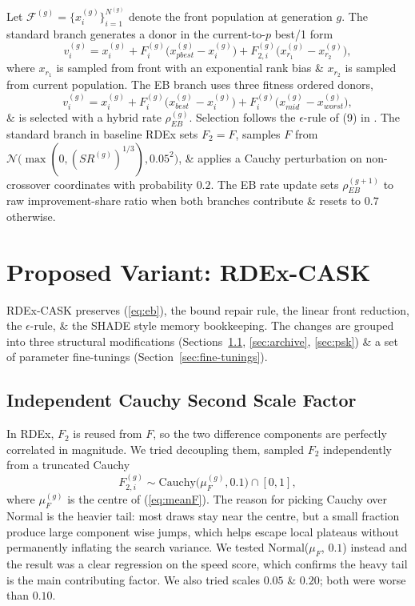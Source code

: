 \documentclass[conference]{IEEEtran}
\begin{document}
Let $\mathcal{F}^{(g)} = \{x_i^{(g)}\}_{i=1}^{N^{(g)}}$ denote the front population at generation $g$. The standard branch generates a donor in the current-to-$p$ best/1 form
\begin{equation}
v_i^{(g)} = x_i^{(g)} + F_i^{(g)}\!\big(x_{pbest}^{(g)} - x_i^{(g)}\big) + F_{2,i}^{(g)}\!\big(x_{r_1}^{(g)} - x_{r_2}^{(g)}\big),
\label{eq:std}
\end{equation}
where $x_{r_1}$ is sampled from front with an exponential rank bias \& $x_{r_2}$ is sampled from current population. The EB branch uses three fitness ordered donors,
\begin{equation}
v_i^{(g)} = x_i^{(g)} + F_i^{(g)}\!\big(x_{best}^{(g)} - x_i^{(g)}\big) + F_i^{(g)}\!\big(x_{mid}^{(g)} - x_{worst}^{(g)}\big),
\label{eq:eb}
\end{equation}
\& is selected with a hybrid rate $\rho_{EB}^{(g)}$. Selection follows the $\epsilon$-rule of (9) in \cite{tao2026rdex}. The standard branch in baseline RDEx sets $F_2 = F$, samples $F$ from $\mathcal{N}\!\bigl(\max(0,(SR^{(g)})^{1/3}), 0.05^2\bigr)$, \& applies a Cauchy perturbation on non-crossover coordinates with probability $0.2$. The EB rate update sets $\rho_{EB}^{(g+1)}$ to raw improvement-share ratio when both branches contribute \& resets to $0.7$ otherwise.

\section{Proposed Variant: RDEx-CASK}
RDEx-CASK preserves (\ref{eq:eb}), the bound repair rule, the linear front reduction, the $\epsilon$-rule, \& the SHADE style memory bookkeeping. The changes are grouped into three structural modifications (Sections~\ref{sec:cauchy}, \ref{sec:archive}, \ref{sec:psk}) \& a set of parameter fine-tunings (Section~\ref{sec:fine-tunings}).

\subsection{Independent Cauchy Second Scale Factor}
\label{sec:cauchy}
In RDEx, $F_2$ is reused from $F$, so the two difference components are perfectly correlated in magnitude. We tried decoupling them, sampled $F_2$ independently from a truncated Cauchy
\begin{equation}
F_{2,i}^{(g)} \sim \mathrm{Cauchy}\bigl(\mu_F^{(g)}, 0.1\bigr) \cap [0,1],
\label{eq:F2}
\end{equation}
where $\mu_F^{(g)}$ is the centre of (\ref{eq:meanF}). The reason for picking Cauchy over Normal is the heavier tail: most draws stay near the centre, but a small fraction produce large component wise jumps, which helps escape local plateaus without permanently inflating the search variance. We tested Normal($\mu_F$, $0.1$) instead and the result was a clear regression on the speed score, which confirms the heavy tail is the main contributing factor. We also tried scales $0.05$ \& $0.20$; both were worse than $0.10$.
\end{document}
